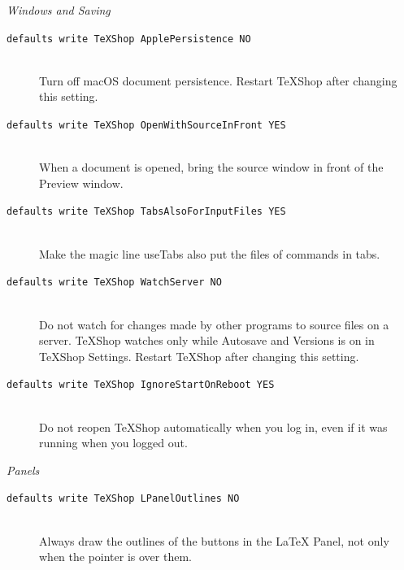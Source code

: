 \documentclass[11pt, oneside]{article}   	%
\begin{document}
{\em Windows and Saving}
\begin{description}
\item[\texttt{defaults write TeXShop ApplePersistence NO}] \hfill \\
Turn off macOS document persistence. Restart TeXShop after changing this setting.

\item[\texttt{defaults write TeXShop OpenWithSourceInFront YES}] \hfill \\
When a document is opened, bring the source window in front of the Preview window.
\item[\texttt{defaults write TeXShop TabsAlsoForInputFiles YES}] \hfill \\
Make the magic line useTabs also put the files of \verb|| commands in tabs.
\item[\texttt{defaults write TeXShop WatchServer NO}] \hfill \\
Do not watch for changes made by other programs to source files on a server. TeXShop watches only while Autosave and Versions is on in TeXShop Settings. Restart TeXShop after changing this setting.
\item[\texttt{defaults write TeXShop IgnoreStartOnReboot YES}] \hfill \\
Do not reopen TeXShop automatically when you log in, even if it was running when you logged out.
\end{description}

{\em Panels}
\begin{description}
\item[\texttt{defaults write TeXShop LPanelOutlines NO}] \hfill \\
Always draw the outlines of the buttons in the LaTeX Panel, not only when the pointer is over them.
\end{description}
\end{document}
